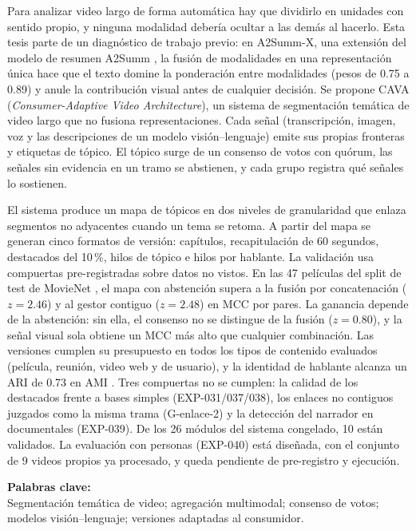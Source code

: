 
Para analizar video largo de forma automática hay que dividirlo en unidades con sentido
propio, y ninguna modalidad debería ocultar a las demás al hacerlo. Esta tesis parte de un
diagnóstico de trabajo previo: en A2Summ-X, una extensión del modelo de resumen A2Summ
\cite{he2023a2summ}, la fusión de modalidades en una representación única hace que el texto
domine la ponderación entre modalidades (pesos de 0.75 a 0.89) y anule la contribución visual
antes de cualquier decisión. Se propone CAVA (\emph{Consumer-Adaptive Video Architecture}),
un sistema de segmentación temática de video largo que no fusiona representaciones. Cada
señal (transcripción, imagen, voz y las descripciones de un modelo visión--lenguaje) emite
sus propias fronteras y etiquetas de tópico. El tópico surge de un consenso de votos con
quórum, las señales sin evidencia en un tramo se abstienen, y cada grupo registra qué
señales lo sostienen.

El sistema produce un mapa de tópicos en dos niveles de granularidad que enlaza segmentos no
adyacentes cuando un tema se retoma. A partir del mapa se generan cinco formatos de versión:
capítulos, recapitulación de 60 segundos, destacados del 10\,\%, hilos de tópico e hilos por
hablante. La validación usa compuertas pre-registradas sobre datos no vistos. En las 47
películas del split de test de MovieNet \cite{huang2020movienet}, el mapa con abstención
supera a la fusión por concatenación ($z = 2.46$) y al gestor contiguo ($z = 2.48$) en MCC
por pares. La ganancia depende de la abstención: sin ella, el consenso no se distingue de la
fusión ($z = 0.80$), y la señal visual sola obtiene un MCC más alto que cualquier
combinación. Las versiones cumplen su presupuesto en todos los tipos de contenido evaluados
(película, reunión, video web y de usuario), y la identidad de hablante alcanza un ARI de 0.73 en
AMI \cite{carletta2007ami}. Tres compuertas no se cumplen: la calidad de los destacados
frente a bases simples (EXP-031/037/038), los enlaces no contiguos juzgados como la misma
trama (G-enlace-2) y la detección del narrador en documentales (EXP-039). De los 26 módulos
del sistema congelado, 10 están validados. La evaluación con personas (EXP-040) está
diseñada, con el conjunto de 9 videos propios ya procesado, y queda pendiente de
pre-registro y ejecución.

\vspace{0.5em}
\noindent \textbf{Palabras clave:}\\
\noindent Segmentación temática de video; agregación multimodal; consenso de votos;
modelos visión--lenguaje; versiones adaptadas al consumidor.
